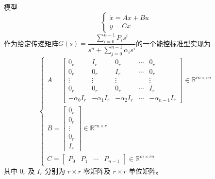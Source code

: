 \begin{theorem}[能控标准型实现]
    模型
    \begin{equation*}
        \begin{cases}
            \dot{x} = Ax + Bu \\
            y = Cx
        \end{cases}
    \end{equation*}
    作为给定传递矩阵$ G(s) = \dfrac{\sum\limits_{i=0}^{n-1} P_i s^i}{s^n + \sum\limits_{j=0}^{n-1} \alpha_i s^i}$的一个能控标准型实现为
    \begin{equation*}
    \begin{cases}
        A = \begin{bmatrix}
        0_r & I_r & 0_r & \cdots & 0_r \\
        0_r & 0_r & I_r & \cdots & 0_r \\
        \vdots & \vdots & \vdots & & \vdots \\
        0_r & 0_r & 0_r & \cdots & I_r \\
        -\alpha_0 I_r & -\alpha_1 I_r & -\alpha_2 I_r & \cdots & -\alpha_{n-1} I_r
        \end{bmatrix} \in \mathbb{R}^{rn \times rn}
        \\[20pt]
        B = \begin{bmatrix}
        0_r \\
        0_r \\
        \vdots \\
        0_r \\
        I_r
        \end{bmatrix} \in \mathbb{R}^{rn \times r}
        \\[20pt]
        C = \begin{bmatrix}
        P_0 & P_1 & \cdots & P_{n-1}
        \end{bmatrix} \in \mathbb{R}^{m \times rn}
        \end{cases}
    \end{equation*}
    其中 $0_r$ 及 $I_r$ 分别为 $r \times r$ 零矩阵及 $r \times r$ 单位矩阵。
\end{theorem}


